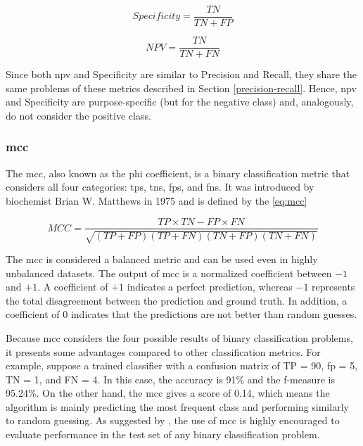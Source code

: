 \begin{equation}
\label{eq:specificity}
Specificity = \frac{TN}{TN + FP}
\end{equation}

\begin{equation}
\label{eq:npv}
NPV = \frac{TN}{TN + FN}
\end{equation}

Since both \acs{npv} and Specificity are similar to Precision and Recall, they share the same problems of these metrics described in Section \ref{precision-recall}. Hence, \acs{npv} and Specificity are purpose-specific (but for the negative class) and, analogously, do not consider the positive class.

\subsubsection{\acl{mcc}} \label{sec:mcc}

The \acf{mcc}, also known as the phi coefficient, is a binary classification metric that considers all four categories: \aclp{tp}, \aclp{tn}, \aclp{fp}, and \aclp{fn}. It was introduced by biochemist Brian W. Matthews in 1975 \citep{matthews1975comparison} and is defined by the \autoref{eq:mcc}

\begin{equation}
\label{eq:mcc}
MCC = \frac{TP \times TN - FP \times FN}{\sqrt{(TP + FP)(TP + FN)(TN + FP)(TN + FN)}}
\end{equation}

The \acs{mcc} is considered a balanced metric and can be used even in highly unbalanced datasets. The output of \acs{mcc} is a normalized coefficient between $-1$ and $+1$. A coefficient of $+1$ indicates a perfect prediction, whereas $-1$ represents the total disagreement between the prediction and ground truth. In addition, a coefficient of $0$ indicates that the predictions are not better than random guesses. 

Because \acs{mcc} considers the four possible results of binary classification problems, it presents some advantages compared to other classification metrics. For example, suppose a trained classifier with a confusion matrix of TP = 90, \acs{fp} = 5, TN = 1, and FN = 4. In this case, the accuracy is 91\% and the f-measure is 95.24\%. On the other hand, the \acs{mcc} gives a score of 0.14, which means the algorithm is mainly predicting the most frequent class and performing similarly to random guessing. As suggested by \cite{chicco2017ten}, the use of \acs{mcc} is highly encouraged to evaluate performance in the test set of any binary classification problem.

